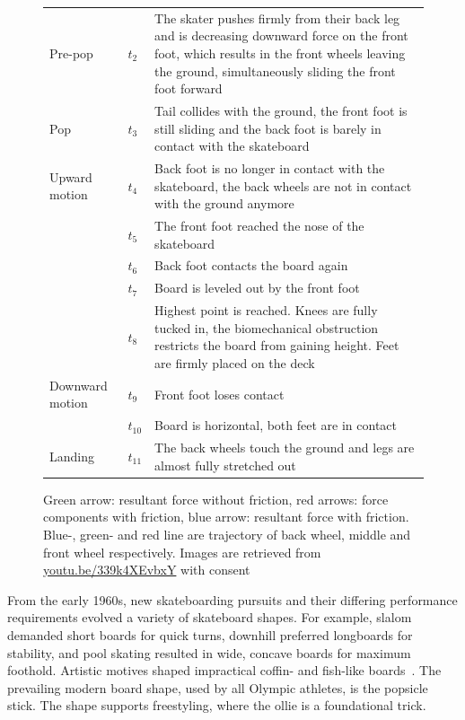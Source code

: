 \documentclass[default,iicol]{sn-jnl}
\begin{document}
\begin{figure}[!t]
\begin{center}
\begin{tabular}{p{1.4cm} p{0.75cm} p{12.5cm}}
        Pre-pop         & $t_2$ & The skater pushes firmly from their back leg and is decreasing downward force on the front foot, which results in the front wheels leaving the ground, simultaneously sliding the front foot forward \\
        Pop             & $t_3$ & Tail collides with the ground, the front foot is still sliding and the back foot is barely in contact with the skateboard~\cite{determan_kinetics_2006,nakashima_simulation_2021} \\
        Upward motion   & $t_4$ & Back foot is no longer in contact with the skateboard, the back wheels are not in contact with the ground anymore~\cite{determan_kinetics_2006,nakashima_simulation_2021} \\
                        & $t_5$ & The front foot reached the nose of the skateboard \\
                        & $t_6$ & Back foot contacts the board again \\
                        & $t_7$ & Board is leveled out by the front foot \\
                        & $t_8$ & Highest point is reached. Knees are fully tucked in, the biomechanical obstruction restricts the board from gaining height. Feet are firmly placed on the deck \\
        Downward motion & $t_9$ & Front foot loses contact \\
                        & $t_{10}$& Board is horizontal, both feet are in contact \\
        Landing         & $t_{11}$& The back wheels touch the ground and legs are almost fully stretched out \\
        \bottomrule
    \end{tabular}
    \end{center}
 \caption[Ollie motion cues]{
    Green arrow: resultant force without friction, red arrows: force components
    with friction, blue arrow: resultant force with friction. Blue-, green- and
    red line are trajectory of back wheel, middle and front wheel respectively. Images are retrieved from \url{youtu.be/339k4XEvbxY} with consent
  }
  \label{fig:ollie steps}
\end{figure}

From the early 1960s, new skateboarding pursuits and their differing performance requirements evolved a variety of skateboard shapes.
For example, slalom demanded short boards for quick turns, downhill preferred longboards for stability, and pool skating resulted in wide, concave boards for maximum foothold. 
Artistic motives shaped impractical coffin- and
fish-like boards~\cite{prentiss_get_2011}.
The prevailing modern board shape, used by all Olympic athletes, is the popsicle stick.
The shape supports freestyling, where the ollie is a foundational trick.
\end{document}
